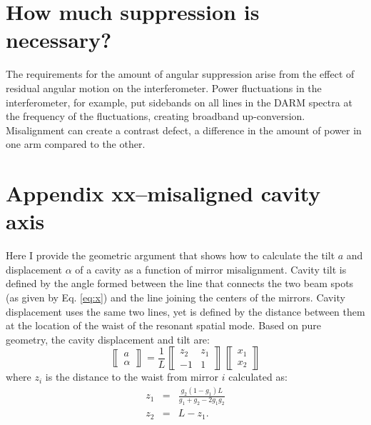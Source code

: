 \section{How much suppression is necessary?}
The requirements for the amount of angular suppression arise from the
effect of residual angular motion on the interferometer. Power
fluctuations in the interferometer, for example, put sidebands on all
lines in the DARM spectra at the frequency of the fluctuations,
creating broadband up-conversion. Misalignment can create a contrast
defect, a difference in the amount of power in one arm compared to the
other.





\section{Appendix xx--misaligned cavity axis}
Here I provide the geometric argument that shows how to calculate the
tilt $a$ and displacement $\alpha$ of a cavity as a function of mirror
misalignment. Cavity tilt is defined by the angle formed between
the line that connects the two beam spots (as given by Eq. \ref{eq:x}) and the line joining the
centers of the mirrors. Cavity displacement uses the same two lines,
yet is defined by the distance between them at the location of the
waist of the resonant spatial mode. Based on pure geometry, the cavity
displacement and tilt are:
\begin{equation}
\left\llbracket \begin{array}{c}
a \\
\alpha \end{array} \right\rrbracket = \frac{1}{L}
\left\llbracket \begin{array}{cc}
z_2 & z_1\\
-1 & 1\end{array} \right\rrbracket
\left\llbracket \begin{array}{c}
x_1\\
x_2 \end{array} \right\rrbracket
\label{eq:cavitydisptilt}
\end{equation}
where $z_i$ is the distance to the waist from mirror $i$ calculated as:
\begin{eqnarray}
z_1 &=& \frac{g_2 (1-g_1) L}{g_1+g_2 - 2 g_1g_2} \\
z_2 &=& L - z_1.
\end{eqnarray}

